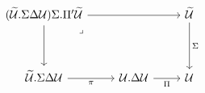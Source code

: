 \[\begin{tikzcd}
	{(\Tm.\Sigma\Delta\Ty)\Sigma.\Pi'\Tm} && \Tm \\
	\\
	{\Tm.\Sigma\Delta\Ty} & {\Ty.\Delta\Ty} & \Ty
	\arrow["\Sigma", from=1-3, to=3-3]
	\arrow["\pi"', from=3-1, to=3-2]
	\arrow["\Pi"', from=3-2, to=3-3]
	\arrow[from=1-1, to=3-1]
	\arrow[from=1-1, to=1-3]
	\arrow["\lrcorner"{anchor=center, pos=0.125}, draw=none, from=1-1, to=3-3]
\end{tikzcd}\]
